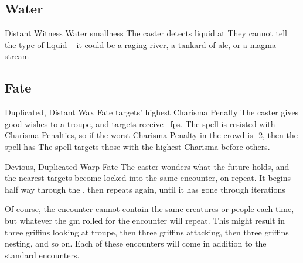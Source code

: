 \begin{multicols}{2}
{  

}

\subsection{Water}
\label{waterSpells}




\setcounter{diceNo}{1}

  {Distant}%
  {Witness}%
  {Water}%
  {smallness}%
  {The caster detects liquid at \spellRange}%
  {They cannot tell the type of liquid -- it could be a raging river, a tankard of ale, or a magma stream}





\subsection{Fate}
\label{fateSpells}

\setcounter{diceNo}{1}


  {Duplicated, Distant}%
  {Wax}%
  {Fate}%
  {targets' highest Charisma Penalty}%
  {The caster gives good wishes to a troupe, and  targets receive \showDam~\glspl{fp}.
  The \gls{spell} is resisted with Charisma Penalties, so if the worst Charisma Penalty in the crowd is -2, then the \gls{spell} has \tn[9]}%
  {The spell targets those with the highest Charisma before others.}


  {Devious, Duplicated}%
  {Warp}%
  {Fate}%
  {}%
  {The caster wonders what the future holds, and the nearest  targets become locked into the same encounter, on repeat.
  It begins half way through the \showOnset, then repeats again, until it has gone through  iterations}%
  {\par
  Of course, the encounter cannot contain the same creatures or people each time, but whatever the \gls{gm} rolled for the encounter will repeat.
  This might result in three \glspl{griffin} looking at troupe, then three \glspl{griffin} attacking, then three \glspl{griffin} nesting, and so on.
  Each of these encounters will come in addition to the standard encounters.}


\end{multicols}
